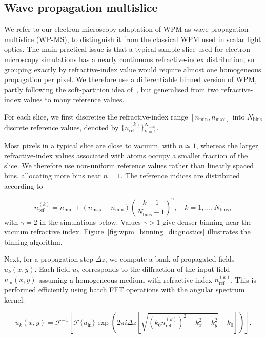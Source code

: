 \documentclass[preprint,12pt,number]{elsarticle}
\begin{document}
\subsection{Wave propagation multislice}
\label{sec:wp_ms}

We refer to our electron-microscopy adaptation of WPM as wave propagation
multislice (WP-MS), to distinguish it from the classical WPM used in scalar
light optics. The main practical issue is that a typical sample slice used for 
electron-microscopy simulations has
a nearly continuous refractive-index distribution, so grouping exactly by
refractive-index value would require almost one homogeneous propagation
per pixel. We therefore use a differentiable binned version of WPM, partly
following the soft-partition idea of~\cite{BarreBrunel2025}, but generalised
from two refractive-index values to many reference values.

For each slice, we first discretise the refractive-index range
$[n_{\mathrm{min}}, n_{\mathrm{max}}]$ into
$N_{\mathrm{bins}}$ discrete reference values, denoted by
$\{n_{\mathrm{ref}}^{(k)}\}_{k=1}^{N_{\mathrm{bins}}}$.

Most pixels in a typical slice are close to vacuum, with $n\simeq 1$, whereas
the larger refractive-index values associated with atoms occupy a smaller
fraction of the slice. We therefore use non-uniform reference values rather
than linearly spaced bins, allocating more bins near $n=1$. The reference
indices are distributed according to

\begin{equation}
\label{eq:wpm_bin_spacing}
n_{\mathrm{ref}}^{(k)}
=
n_{\mathrm{min}}
+
(n_{\mathrm{max}} - n_{\mathrm{min}})
\left( \frac{k-1}{N_{\mathrm{bins}}-1} \right)^\gamma,
\quad
k=1,\ldots,N_{\mathrm{bins}},
\end{equation}
with $\gamma=2$ in the simulations below. Values $\gamma>1$ give denser
binning near the vacuum refractive index. Figure~\ref{fig:wpm_binning_diagnostics}
illustrates the binning algorithm.

Next, for a propagation step $\Delta z$, we compute a bank of propagated fields
$u_k(x,y)$. Each field $u_k$ corresponds to the diffraction of the input field
$u_{\mathrm{in}}(x,y)$ assuming a homogeneous medium with refractive index
$n_{\mathrm{ref}}^{(k)}$. This is performed efficiently using batch FFT
operations with the angular spectrum kernel:

\begin{equation}
\label{eq:wpm_binned_fields}
u_k(x,y)
=
\mathcal{F}^{-1}
\left[
\mathcal{F}\{u_{\mathrm{in}}\}
\exp\left(
2\pi i \Delta z
\left[\sqrt{(k_0 n_{\mathrm{ref}}^{(k)})^2-k_x^2-k_y^2}-k_0\right]
\right)
\right].
\end{equation}
\end{document}
